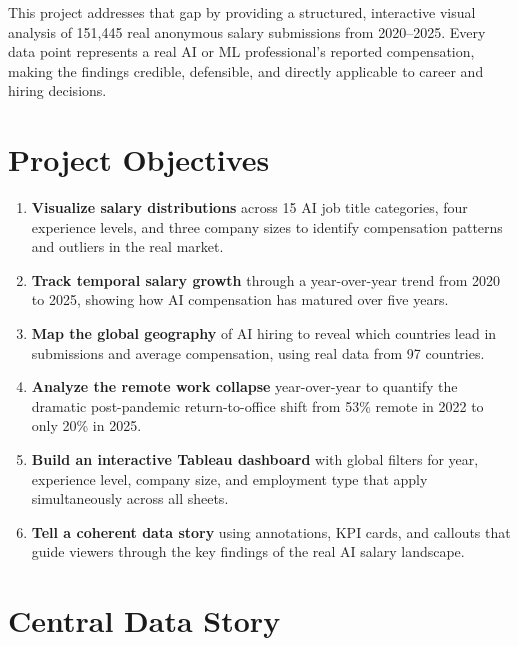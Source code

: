 \documentclass[12pt,a4paper]{article}
\begin{document}
This project addresses that gap by providing a structured, interactive visual analysis
of 151{,}445 real anonymous salary submissions from 2020--2025. Every data point
represents a real AI or ML professional's reported compensation, making the findings
credible, defensible, and directly applicable to career and hiring decisions.

\section{Project Objectives}

\begin{enumerate}[leftmargin=2em, itemsep=6pt]
  \item \textbf{Visualize salary distributions} across 15 AI job title categories,
        four experience levels, and three company sizes to identify compensation
        patterns and outliers in the real market.

  \item \textbf{Track temporal salary growth} through a year-over-year trend from
        2020 to 2025, showing how AI compensation has matured over five years.

  \item \textbf{Map the global geography} of AI hiring to reveal which countries lead
        in submissions and average compensation, using real data from 97 countries.

  \item \textbf{Analyze the remote work collapse} year-over-year to quantify the
        dramatic post-pandemic return-to-office shift from 53\% remote in 2022 to
        only 20\% in 2025.

  \item \textbf{Build an interactive Tableau dashboard} with global filters for year,
        experience level, company size, and employment type that apply simultaneously
        across all sheets.

  \item \textbf{Tell a coherent data story} using annotations, KPI cards, and callouts
        that guide viewers through the key findings of the real AI salary landscape.
\end{enumerate}

\section{Central Data Story}
\end{document}
